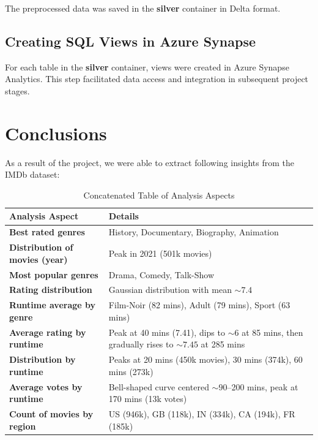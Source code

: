 \documentclass[a4paper,12pt]{article}
\begin{document}
The preprocessed data was saved in the \textbf{silver} container in Delta format.

\subsection{Creating SQL Views in Azure Synapse}
For each table in the \textbf{silver} container, views were created in Azure Synapse Analytics. This step facilitated data access and integration in subsequent project stages.

\section{Conclusions}
\label{sec:conclusions}

As a result of the project, we were able to extract following insights from the IMDb dataset:

\begin{table}[ht]
    \centering
    \begin{tabular}{|l|p{10cm}|}
    \hline
    \textbf{Analysis Aspect} & \textbf{Details} \\
    \hline
    \textbf{Best rated genres} & History, Documentary, Biography, Animation \\
    \hline
    \textbf{Distribution of movies (year)} & Peak in 2021 (501k movies) \\
    \hline
    \textbf{Most popular genres} & Drama, Comedy, Talk-Show \\
    \hline
    \textbf{Rating distribution} & Gaussian distribution with mean \(\sim 7.4\) \\
    \hline
    \textbf{Runtime average by genre} & Film-Noir (82 mins), Adult (79 mins), Sport (63 mins) \\
    \hline
    \textbf{Average rating by runtime} & Peak at 40 mins (7.41), dips to \(\sim 6\) at 85 mins, then gradually rises to \(\sim 7.45\) at 285 mins \\
    \hline
    \textbf{Distribution by runtime} & Peaks at 20 mins (450k movies), 30 mins (374k), 60 mins (273k) \\
    \hline
    \textbf{Average votes by runtime} & Bell-shaped curve centered \(\sim 90\)–200 mins, peak at 170 mins (13k votes) \\
    \hline
    \textbf{Count of movies by region} & US (946k), GB (118k), IN (334k), CA (194k), FR (185k) \\
    \hline
    \end{tabular}
    \caption{Concatenated Table of Analysis Aspects}
    \label{tab:analysis_aspects}
\end{table}
    
\end{document}
